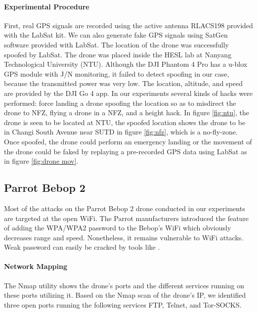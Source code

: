 \documentclass[conference]{IEEEtran}
\begin{document}
\paragraph*{Experimental Procedure}
First, real GPS signals are recorded using the active antenna RLACS198 provided with the LabSat kit.
We can also generate fake GPS signals using SatGen software provided with LabSat. 
The location of the drone was successfully spoofed by LabSat. 
The drone was placed inside the HESL lab at Nanyang Technological University (NTU).
Although the DJI Phantom 4 Pro has a u-blox GPS module with J/N monitoring, it failed to detect spoofing in our case, because the transmitted power was very low. 
The location, altitude, and speed are provided by the DJI Go 4 app.
In our experiments several kinds of hacks were performed: force landing a drone spoofing the location so as to misdirect the drone to NFZ, flying a drone in a NFZ, and a height hack.
In figure \ref{fig:ntu}, the drone is seen to be located at NTU, the spoofed location shows the drone to be in Changi South Avenue near SUTD in figure \ref{fig:nfz}, which is a no-fly-zone.  
Once spoofed, the drone could perform an emergency landing or 
the movement of the drone could be faked by replaying a pre-recorded GPS data using LabSat as in figure \ref{fig:drone mov}.

\subsection{Parrot Bebop 2} \label{sec:Bebop_attacks}
Most of the attacks on the Parrot Bebop 2 drone conducted in our experiments are targeted at the open WiFi. 
The Parrot manufacturers introduced the feature of adding the WPA/WPA2 password to the Bebop's WiFi which obviously decreases range and speed. Nonetheless, it remains vulnerable to WiFi attacks. 
Weak password can easily be cracked by tools like \cite{aircrack}.

\noindent \paragraph*{Network Mapping}
The Nmap utility shows the drone’s ports and the different services running on these ports utilizing it. 
Based on the Nmap scan of the drone's IP, we identified three open ports running the following services FTP, Telnet, and Tor-SOCKS.
\end{document}
